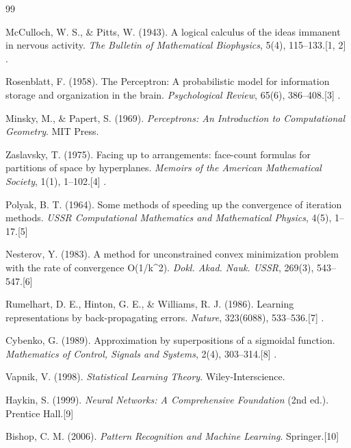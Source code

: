 \begin{thebibliography}{99}
	
	McCulloch, W. S., \& Pitts, W. (1943). 
	A logical calculus of the ideas immanent in nervous activity. 
	\emph{The Bulletin of Mathematical Biophysics}, 5(4), 115--133.[1, 2]
	.
	
	Rosenblatt, F. (1958). 
	The Perceptron: A probabilistic model for information storage and organization in the brain. 
	\emph{Psychological Review}, 65(6), 386--408.[3]
	.
	
	Minsky, M., \& Papert, S. (1969). 
	\emph{Perceptrons: An Introduction to Computational Geometry}. 
	MIT Press.
	
	Zaslavsky, T. (1975). 
	Facing up to arrangements: face-count formulas for partitions of space by hyperplanes. 
	\emph{Memoirs of the American Mathematical Society}, 1(1), 1--102.[4]
	.
	
	Polyak, B. T. (1964).
	Some methods of speeding up the convergence of iteration methods.
	\emph{USSR Computational Mathematics and Mathematical Physics}, 4(5), 1--17.[5]
	
	Nesterov, Y. (1983).
	A method for unconstrained convex minimization problem with the rate of convergence O(1/k\textasciicircum2).
	\emph{Dokl. Akad. Nauk. USSR}, 269(3), 543--547.[6]
	
	Rumelhart, D. E., Hinton, G. E., \& Williams, R. J. (1986). 
	Learning representations by back-propagating errors. 
	\emph{Nature}, 323(6088), 533--536.[7]
	.
	
	Cybenko, G. (1989). 
	Approximation by superpositions of a sigmoidal function. 
	\emph{Mathematics of Control, Signals and Systems}, 2(4), 303--314.[8]
	.
	
	Vapnik, V. (1998).
	\emph{Statistical Learning Theory}.
	Wiley-Interscience.
	
	Haykin, S. (1999). 
	\emph{Neural Networks: A Comprehensive Foundation} (2nd ed.). 
	Prentice Hall.[9]
	
	Bishop, C. M. (2006). 
	\emph{Pattern Recognition and Machine Learning}. 
	Springer.[10]
	

\end{thebibliography}
